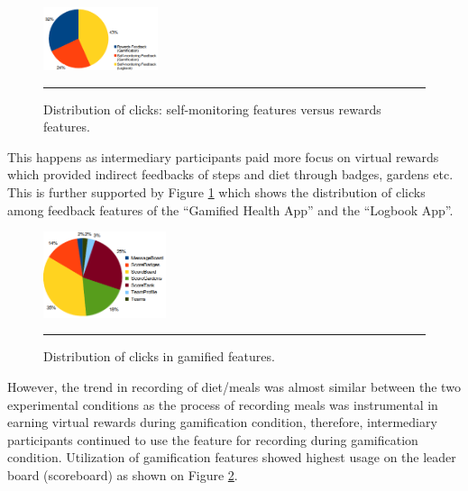 \documentclass{sig-alternate}
\begin{document}
\begin{figure}[htbp]
  \centering
    \includegraphics[width=0.3\textwidth]{clicks_distr.png}
    \rule{26em}{0.5pt}
  \caption{Distribution of clicks: self-monitoring features versus rewards features.}
  \label{figure:clicks_distr}
\end{figure}\newline 
This happens as intermediary participants paid more focus on virtual rewards which provided indirect feedbacks of steps and diet through badges, gardens etc. This is further supported by Figure \ref{figure:clicks_distr} which shows the distribution of clicks among feedback features of the ``Gamified Health App'' and the ``Logbook App''.
\begin{figure}[htbp]
  \centering
    \includegraphics[width=0.32\textwidth]{clicks_rewards.png}
    \rule{26em}{0.5pt}
  \caption{Distribution of clicks in gamified features.}
  \label{figure:rewards_clicks}
\end{figure}
However, the trend in recording of diet/meals was almost similar between the two experimental conditions as the process of recording meals was instrumental in earning virtual rewards during gamification condition, therefore, intermediary participants continued to use the feature for recording during gamification condition. Utilization of gamification features showed highest usage on the leader board (scoreboard) as shown on Figure \ref{figure:rewards_clicks}.\newline
\end{document}
